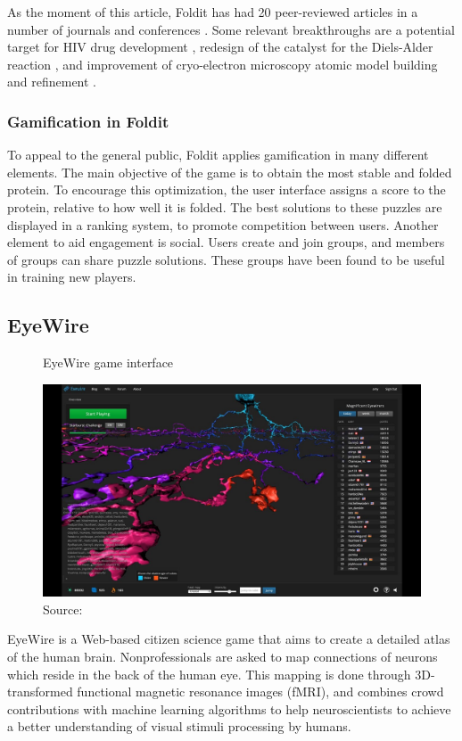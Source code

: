 As the moment of this article, Foldit has had 20 peer-reviewed articles in a number of journals and conferences \cite{foldit2021publications}. Some relevant breakthroughs are a potential target for HIV drug development \cite{khatib2011crystal}, redesign of the catalyst for the Diels-Alder reaction \cite{eiben2012increased}, and improvement of cryo-electron microscopy atomic model building and refinement \cite{khatib2019building}.

\subsubsection{Gamification in Foldit}

To appeal to the general public, Foldit applies gamification in many different elements. The main objective of the game is to obtain the most stable and folded protein. To encourage this optimization, the user interface assigns a score to the protein, relative to how well it is folded. The best solutions to these puzzles are displayed in a ranking system, to promote competition between users. Another element to aid engagement is social. Users create and join groups, and members of groups can share puzzle solutions. These groups have been found to be useful in training new players.

\subsection{EyeWire}

\begin{figure}[ht]
    \centering
    \caption{EyeWire game interface}
    \includegraphics[width=0.8\linewidth]{images/background/eyewire.jpg}
    \caption*{Source: \cite{eyewire2014how}}
    \label{fig:eyewire-game-interface}
\end{figure}

EyeWire is a Web-based citizen science game that aims to create a detailed atlas of the human brain. Nonprofessionals are asked to map connections of neurons which reside in the back of the human eye. This mapping is done through 3D-transformed functional magnetic resonance images (fMRI), and combines crowd contributions with machine learning algorithms to help neuroscientists to achieve a better understanding of visual stimuli processing by humans.

